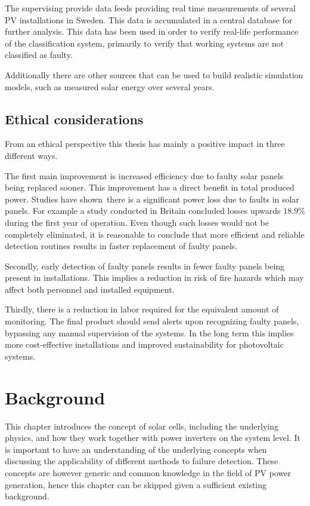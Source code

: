 The supervising provide data feeds providing real time measurements of several PV installations in Sweden.
This data is accumulated in a central database for further analysis.
This data has been used in order to verify real-life performance of the classification system, primarily to verify that working systems are not classified as faulty.

Additionally there are other sources that can be used to build realistic simulation models, such as measured solar energy over several years.

\section{Ethical considerations}
From an ethical perspective this thesis has mainly a positive impact in three different ways.

The first main improvement is increased efficiency due to faulty solar panels being replaced sooner.
This improvement has a direct benefit in total produced power.
Studies have shown there is a significant power loss due to faults in solar panels.
For example a study conducted in Britain concluded losses upwards $18.9\%$ during the first year of operation\cite{Firth2010}.
Even though such losses would not be completely eliminated, it is reasonable to conclude that more efficient and reliable detection routines results in faster replacement of faulty panels.

Secondly, early detection of faulty panels results in fewer faulty panels being present in installations.
This implies a reduction in risk of fire hazards\cite{Zhao2010night} which may affect both personnel and installed equipment.

Thirdly, there is a reduction in labor required for the equivalent amount of monitoring.
The final product should send alerts upon recognizing faulty panels, bypassing any manual supervision of the systems.
In the long term this implies more cost-effective installations and improved sustainability for photovoltaic systems.

\chapter{Background}
This chapter introduces the concept of solar cells, including the underlying physics,
and how they work together with power inverters on the system level.
It is important to have an understanding of the underlying concepts when discussing the applicability of different methods to failure detection.
These concepts are however generic and common knowledge in the field of PV power generation, 
hence this chapter can be skipped given a sufficient existing background.

